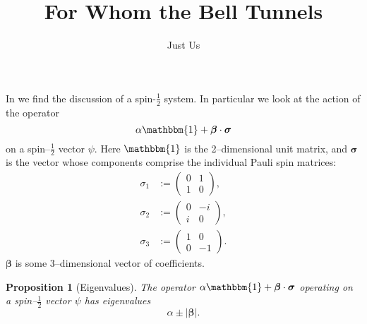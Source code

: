 \documentclass[12pt]{article}
\title{For Whom the Bell Tunnels}
\author{Just Us}
\newtheorem{prop}[thm]{Proposition}
\begin{document}
\maketitle

In \cite[p.448]{Bell1966} we find the discussion of a spin-$\frac{1}{2}$ system.  In particular we look at the action of the operator
\begin{displaymath}
  \alpha \mathbbm{1} + \bm{\beta} \cdot \bm{\sigma}
\end{displaymath}
on a spin--$\frac{1}{2}$ vector $\psi$.  Here $\mathbbm{1}$ is the 2--dimensional unit matrix, and $\bm{\sigma}$ is the vector whose components comprise the individual Pauli spin matrices:
\begin{align*}
  \sigma_1 &:= \begin{pmatrix}
                 0 & 1 \\
                 1 & 0
               \end{pmatrix},
              \\
  \sigma_2 &:= \begin{pmatrix}
                 0 & -i \\
                 i & 0
               \end{pmatrix},
              \\
  \sigma_3 &:= \begin{pmatrix}
                 1 & 0 \\
                 0 & -1
               \end{pmatrix}.
\end{align*}
$\bm{\beta}$ is some 3--dimensional vector of coefficients.

\begin{prop}[Eigenvalues]
  The operator $\alpha \mathbbm{1} + \bm{\beta} \cdot \bm{\sigma}$ operating on a spin--$\frac{1}{2}$ vector $\psi$ has eigenvalues
  \begin{displaymath}
    \alpha \pm |\bm{\beta}|.
  \end{displaymath}
\end{prop}
\end{document}
